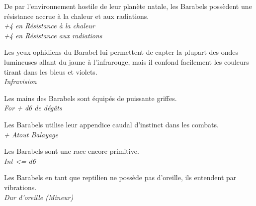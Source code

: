 \begin{description}[align=left]
\item [Enfance difficile] 	%
		De par l’environnement hostile de leur planète natale, les Barabels possèdent une résistance accrue à la chaleur et aux radiations.\\
		\textit{+4 en Résistance à la chaleur}\\
		\textit{+4 en Résistance aux radiations}
\item [\OE{il} Ophidien] 	%
		Les yeux ophidiens du Barabel lui permettent de capter la plupart des ondes lumineuses allant du jaune à l’infrarouge, mais il confond facilement les couleurs tirant dans les bleus et violets.\\
		\textit{Infravision}
\item [Arme naturelle]		%
		Les mains des Barabels sont équipés de puissante griffes.\\
		\textit{For + d6 de dégâts}
\item [Balayage]			%
		Les Barabels utilise leur appendice caudal d’instinct dans les combats.\\
		\textit{+ Atout Balayage}
\item [Primitif]			%
		Les Barabels sont une race encore primitive.\\
		\textit{Int <= d6}
\item [Dur d’oreille]		%
		Les Barabels en tant que reptilien ne possède pas d’oreille, ils entendent par vibrations.\\
		\textit{Dur d’oreille (Mineur)}
\end{description}